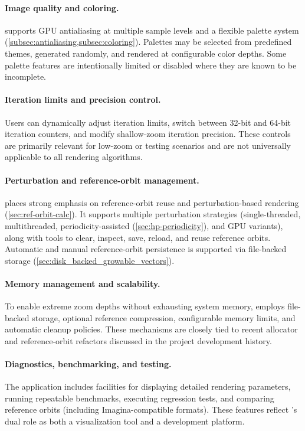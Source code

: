\paragraph{Image quality and coloring.}
\FractalShark{} supports GPU antialiasing at multiple sample levels and a
flexible palette system (\cref{subsec:antialiasing,subsec:coloring}).  Palettes may be selected from predefined themes,
generated randomly, and rendered at configurable color depths.  Some palette
features are intentionally limited or disabled where they are known to be
incomplete.

\paragraph{Iteration limits and precision control.}
Users can dynamically adjust iteration limits, switch between 32-bit and
64-bit iteration counters, and modify shallow-zoom iteration precision.
These controls are primarily relevant for low-zoom or testing scenarios and
are not universally applicable to all rendering algorithms.

\paragraph{Perturbation and reference-orbit management.}
\FractalShark{} places strong emphasis on reference-orbit reuse and
perturbation-based rendering (\cref{sec:ref-orbit-calc}).  It supports multiple perturbation strategies
(single-threaded, multithreaded, periodicity-assisted (\cref{sec:hp-periodicity}), and GPU
variants), along with tools to clear, inspect, save, reload, and reuse
reference orbits.  Automatic and manual reference-orbit persistence is
supported via file-backed storage (\cref{sec:disk_backed_growable_vectors}).

\paragraph{Memory management and scalability.}
To enable extreme zoom depths without exhausting system memory, \FractalShark{}
employs file-backed storage, optional reference compression, configurable
memory limits, and automatic cleanup policies.  These mechanisms are closely
tied to recent allocator and reference-orbit refactors discussed in the
project development history.

\paragraph{Diagnostics, benchmarking, and testing.}
The application includes facilities for displaying detailed rendering
parameters, running repeatable benchmarks, executing regression tests, and
comparing reference orbits (including Imagina-compatible formats).  These
features reflect \FractalShark{}'s dual role as both a visualization tool and a
development platform.

